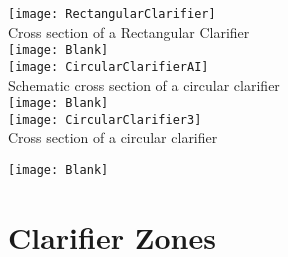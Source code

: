 \clearpage
			\begin{center}
				\texttt{[image: RectangularClarifier]}\\
				Cross section of a Rectangular Clarifier\\

				\texttt{[image: Blank]}\\
				\texttt{[image: CircularClarifierAI]}\\
				Schematic cross section of a circular clarifier\\
				\texttt{[image: Blank]}\\
				\texttt{[image: CircularClarifier3]}\\
				Cross section of a circular clarifier\\
			\end{center}
				\texttt{[image: Blank]}\\


\section{Clarifier Zones}
				
